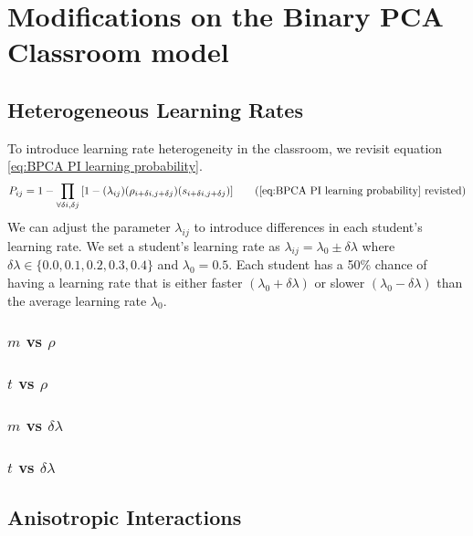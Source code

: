 \chapter{Modifications on the Binary PCA Classroom model}

\section{Heterogeneous Learning Rates}
To introduce learning rate heterogeneity in the classroom, we revisit equation \ref{eq:BPCA PI learning probability}. 
\begin{equation*}
    P_{ij} = 1 - \prod_{\forall \delta i, \delta j}{\lbrack1-(\lambda_{ij})(\rho_{i+\delta i, j+\delta j})(s_{i+\delta i, j+\delta j})}\rbrack
    \tag{\ref{eq:BPCA PI learning probability} revisted}
\end{equation*}
We can adjust the parameter $\lambda_{ij}$ to introduce differences in each student's learning rate. We set a student's learning rate as $\lambda_{ij} = \lambda_0 \pm \delta\lambda$ where $\delta\lambda \in \lbrace 0.0,0.1, 0.2, 0.3, 0.4\rbrace$ and $\lambda_0 = 0.5$. Each student has a 50\% chance of having a learning rate that is either faster $(\lambda_0 + \delta\lambda)$ or slower $(\lambda_0 - \delta\lambda)$ than the average learning rate $\lambda_0$. 

\subsection{$m$ vs $\rho$}\label{subsec:BPCAIH m vs rho}
\subsection{$t$ vs $\rho$}\label{subsec:BPCAIH t vs rho}
\subsection{$m$ vs $\delta\lambda$}\label{subsec:BPCAIH m vs dl}
\subsection{$t$ vs $\delta\lambda$}\label{subsec:BPCAIH t vs dl}

\section{Anisotropic Interactions}
